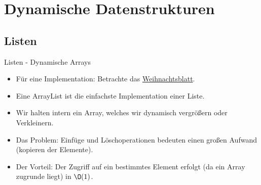 
\section{Dynamische Datenstrukturen}

\subsection{Listen}

\begin{frame}{Listen - Dynamische Arrays}
    \begin{itemize}[<+(1)->]
        \widei
        \item Für eine Implementation: Betrachte das \href{https://github.com/EagleoutIce/eidi-weihnachttsblatt-19_20}{Weihnachtsblatt}.
        \item Eine ArrayList ist die einfachste Implementation einer Liste.
        \item Wir halten intern ein Array, welches wir dynamisch vergrößern oder Verkleinern.
        \item Das Problem: Einfüge und Löschoperationen bedeuten einen großen Aufwand (kopieren der Elemente).
        \item Der Vorteil: Der Zugriff auf ein bestimmtes Element erfolgt (da ein Array zugrunde liegt) in \(\O(1)\).
    \end{itemize}
\end{frame}

\def\Element#1{{\renewcommand{\arraystretch}{1.4}%
    \begin{tabular}{|>{\centering}p{1em}|p{1em}|}
        \hline
            \strut#1 & \\
        \hline
    \end{tabular}%
}}

\def\EndElement{{\renewcommand{\arraystretch}{1.5}%
    \begin{tabular}{|>{\centering\arraybackslash}p{1em}|}
        \hline
            \strut/\\
        \hline
    \end{tabular}
}}

